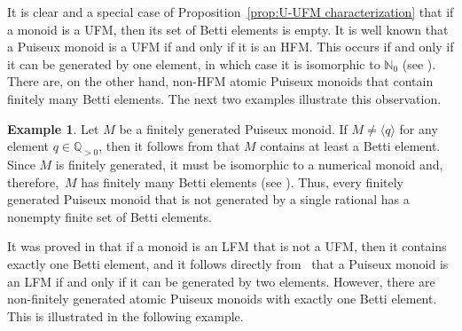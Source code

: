 \documentclass[12pt]{amsart}
\theoremstyle{definition}
\newtheorem{example}[theorem]{Example}
\numberwithin{equation}{section}
\newcommand{\nn}{\mathbb{N}}
\newcommand{\qq}{\mathbb{Q}}
\begin{document}
It is clear and a special case of Proposition~\ref{prop:U-UFM characterization} that if a monoid is a UFM, then its set of Betti elements is empty. It is well known that a Puiseux monoid is a UFM if and only if it is an HFM. This occurs if and only if it can be generated by one element, in which case it is isomorphic to $\nn_0$ (see \cite[Proposition~4.3]{fG20}). There are, on the other hand, non-HFM atomic Puiseux monoids that contain finitely many Betti elements. The next two examples illustrate this observation.

\begin{example} \label{ex:Betti elements of f.g. PMs}
	Let $M$ be a finitely generated Puiseux monoid. If $M \neq \langle q \rangle$ for any element $q \in \qq_{>0}$, then it follows from \cite[Remark~2]{GO10} that $M$ contains at least a Betti element. Since $M$ is finitely generated, it must be isomorphic to a numerical monoid and, therefore,~$M$ has finitely many Betti elements (see \cite[Section~9.3]{GR09}). Thus, every finitely generated Puiseux monoid that is not generated by a single rational has a nonempty finite set of Betti elements.
\end{example}

It was proved in \cite[Proposition~3.5]{CCGS21} that if a monoid is an LFM that is not a UFM, then it contains exactly one Betti element, and it follows directly from~\cite[Proposition~5.7]{CCGS21} that a Puiseux monoid is an LFM if and only if it can be generated by two elements. However, there are non-finitely generated atomic Puiseux monoids with exactly one Betti element. This is illustrated in the following example.
\end{document}

